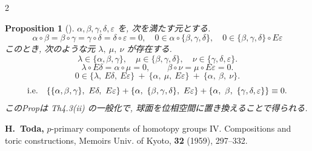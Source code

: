\documentclass[10pt, leqno]{ltjsarticle}
\newcommand{\Ex}{E}        %
\numberwithin{equation}{section}
\theoremstyle{plain}
\newtheorem{proposition}[theorem]{Proposition}
\theoremstyle{definition}
\theoremstyle{remark}
\begin{document}
\begin{paracol}{2}

\begin{proposition}[]\label{prop:1-5}
$\alpha,\beta,\gamma,\delta,\varepsilon$ を,
次を満たす元とする. 
\[
\alpha\circ \beta=\beta\circ\gamma=\gamma\circ\delta=\delta\circ\varepsilon=0,\quad
0\in \alpha\circ\{\beta, \gamma, \delta\},\quad
0\in\{\beta, \gamma, \delta\}\circ\Ex\varepsilon
\]
このとき,
次のような元 \(\lambda,\ \mu,\ \nu\) が存在する.
\[
\lambda\in\{\alpha,\beta,\gamma\},\quad
\mu\in\{\beta,\gamma,\delta\},\quad
\nu\in\{\gamma,\delta,\varepsilon\}.
\]
\[
\lambda\circ \Ex\delta=\alpha\circ \mu=0,\qquad
\beta\circ \nu=\mu\circ \Ex\varepsilon=0.
\]
\[
0 \in 
\{\lambda,\ \Ex\delta,\ \Ex\varepsilon\}
\ +\
\{\alpha,\ \mu,\ \Ex\varepsilon\}
\ +\
\{\alpha,\ \beta,\ \nu\}.
\]
\[
\textnormal{i.e.}\quad
\{\{\alpha,\beta,\gamma\},\ E\delta,\ E\varepsilon\}
+\{\alpha,\ \{\beta,\gamma,\delta\},\ E\varepsilon\}
+\{\alpha,\ \beta,\ \{\gamma,\delta,\varepsilon\}\}
\equiv0 .
\]
\textnormal{このPropは \cite{Toda1959}Th4.3(ii) の一般化で, 
球面を位相空間に置き換えることで得られる. }
\end{proposition}

\switchcolumn

\noindent
\textbf{\cite{Toda1959}
H.~Toda,}
\newblock $p$-primary components of homotopy groups IV. Compositions and toric constructions,
\newblock Memoirs Univ. of Kyoto, {\bf 32} (1959), 297--332.


\end{paracol}
\end{document}
